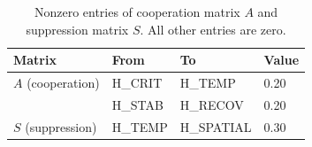 \begin{table}[t]
\centering
\caption{Nonzero entries of cooperation matrix $A$ and suppression matrix $S$.
All other entries are zero.}
\label{tab:as-matrices}
\small
\begin{tabular}{@{}llll@{}}
\toprule
\textbf{Matrix} & \textbf{From} & \textbf{To} & \textbf{Value} \\
\midrule
$A$ (cooperation) & H\_CRIT    & H\_TEMP   & 0.20 \\
                  & H\_STAB    & H\_RECOV  & 0.20 \\
\midrule
$S$ (suppression) & H\_TEMP    & H\_SPATIAL & 0.30 \\
\bottomrule
\end{tabular}
\end{table}
